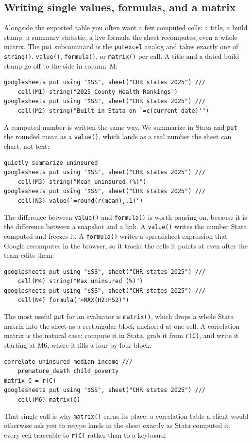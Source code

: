 \documentclass[
    a4paper,
    fontsize=10pt,
    twoside=true,
    numbers=noenddot,
]{kaobook}
\begin{document}
\subsection{Writing single values, formulas, and a matrix}
Alongside the exported table you often want a few computed cells: a title, a build stamp, a summary statistic, a live formula the sheet recomputes, even a whole matrix. The \texttt{put} subcommand is the \texttt{putexcel} analog and takes exactly one of \texttt{string()}, \texttt{value()}, \texttt{formula()}, or \texttt{matrix()} per call. A title and a dated build stamp go off to the side in column~M:
{\footnotesize
\begin{verbatim}
googlesheets put using "$SS", sheet("CHR states 2025") ///
    cell(M1) string("2025 County Health Rankings")
googlesheets put using "$SS", sheet("CHR states 2025") ///
    cell(M2) string("Built in Stata on `=c(current_date)'")
\end{verbatim}
}
A computed number is written the same way. We summarize in Stata and \texttt{put} the rounded mean as a \texttt{value()}, which lands as a real number the sheet can chart, not text:
{\footnotesize
\begin{verbatim}
quietly summarize uninsured
googlesheets put using "$SS", sheet("CHR states 2025") ///
    cell(M3) string("Mean uninsured (%)")
googlesheets put using "$SS", sheet("CHR states 2025") ///
    cell(N3) value(`=round(r(mean),.1)')
\end{verbatim}
}
The difference between \texttt{value()} and \texttt{formula()} is worth pausing on, because it is the difference between a snapshot and a link. A \texttt{value()} writes the number Stata computed and freezes it. A \texttt{formula()} writes a spreadsheet expression that Google recomputes in the browser, so it tracks the cells it points at even after the team edits them:
{\footnotesize
\begin{verbatim}
googlesheets put using "$SS", sheet("CHR states 2025") ///
    cell(M4) string("Max uninsured (%)")
googlesheets put using "$SS", sheet("CHR states 2025") ///
    cell(N4) formula("=MAX(H2:H52)")
\end{verbatim}
}
The most useful \texttt{put} for an evaluator is \texttt{matrix()}, which drops a whole Stata matrix into the sheet as a rectangular block anchored at one cell. A correlation matrix is the natural case: compute it in Stata, grab it from \texttt{r(C)}, and write it starting at M6, where it fills a four-by-four block:
{\footnotesize
\begin{verbatim}
correlate uninsured median_income ///
    premature_death child_poverty
matrix C = r(C)
googlesheets put using "$SS", sheet("CHR states 2025") ///
    cell(M6) matrix(C)
\end{verbatim}
}
That single call is why \texttt{matrix()} earns its place: a correlation table a client would otherwise ask you to retype lands in the sheet exactly as Stata computed it, every cell traceable to \texttt{r(C)} rather than to a keyboard.
\end{document}

